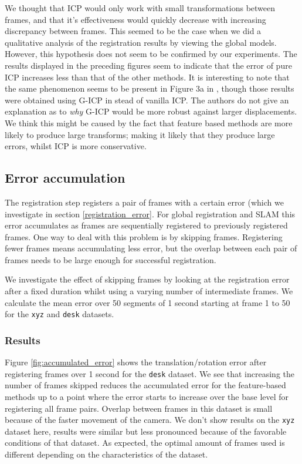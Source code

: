 \documentclass[a4paper]{article}
\begin{document}
We thought that \ac{ICP} would only work with small transformations between frames, and that it's effectiveness would quickly decrease with increasing discrepancy between frames. This seemed to be the case when we did a qualitative analysis of the registration results by viewing the global models. However, this hypothesis does not seem to be confirmed by our experiments. The results displayed in the preceding figures seem to indicate that the error of pure \ac{ICP} increases less than that of the other methods. It is interesting to note that the same phenomenon seems to be present in Figure 3a in \cite{steinbruecker_sturm_cremers_iccv11}, though those results were obtained using G-ICP in stead of vanilla \ac{ICP}. The authors do not give an explanation as to \emph{why} G-ICP would be more robust against larger displacements. We think this might be caused by the fact that feature based methods are more likely to produce large transforms; making it likely that they produce large errors, whilst \ac{ICP} is more conservative.

\subsection{Error accumulation}
\label{accumulated_error}

The registration step registers a pair of frames with a certain error (which we investigate in section \ref{registration_error}. For global registration and \ac{SLAM} this error accumulates as frames are sequentially registered to previously registered frames. One way to deal with this problem is by skipping frames. Registering fewer frames means accumulating less error, but the overlap between each pair of frames needs to be large enough for successful registration. 

We investigate the effect of skipping frames by looking at the registration error after a fixed duration whilst using a varying number of intermediate frames. We calculate the mean error over 50 segments of 1 second starting at frame 1 to 50 for the \texttt{xyz} and \texttt{desk} datasets.

\subsubsection{Results}

Figure \ref{fig:accumulated_error} shows the translation/rotation error after registering frames over 1 second for the \texttt{desk} dataset. We see that increasing the number of frames skipped reduces the accumulated error for the feature-based methods up to a point where the error starts to increase over the base level for registering all frame pairs. Overlap between frames in this dataset is small because of the faster movement of the camera.  We don't show results on the \texttt{xyz} dataset here, results were similar but less pronounced because of the favorable conditions of that dataset. As expected, the optimal amount of frames used is different depending on the characteristics of the dataset.
\end{document}
